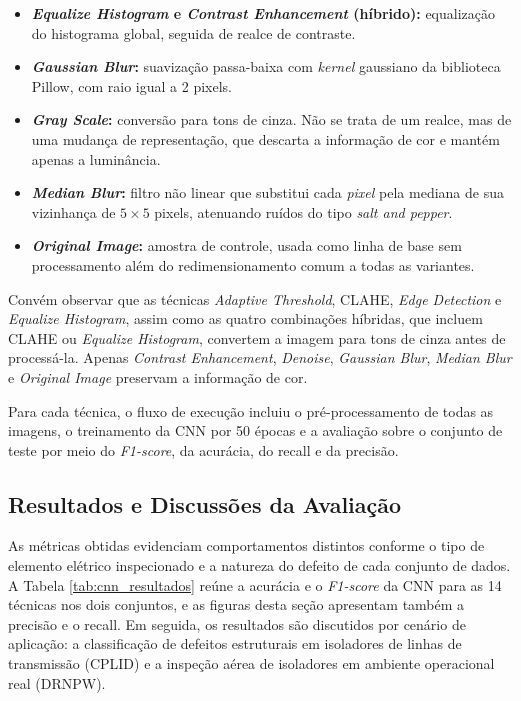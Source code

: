 \begin{itemize}
    \item \textbf{\textit{Equalize Histogram} e \textit{Contrast Enhancement} (híbrido):} equalização do histograma global, seguida de realce de contraste.
    \item \textbf{\textit{Gaussian Blur}:} suavização passa-baixa com \textit{kernel} gaussiano da biblioteca Pillow, com raio igual a 2 pixels.
    \item \textbf{\textit{Gray Scale}:} conversão para tons de cinza. Não se trata de um realce, mas de uma mudança de representação, que descarta a informação de cor e mantém apenas a luminância.
    \item \textbf{\textit{Median Blur}:} filtro não linear que substitui cada \textit{pixel} pela mediana de sua vizinhança de $5 \times 5$ pixels, atenuando ruídos do tipo \textit{salt and pepper}.
    \item \textbf{\textit{Original Image}:} amostra de controle, usada como linha de base sem processamento além do redimensionamento comum a todas as variantes.
\end{itemize}

Convém observar que as técnicas \textit{Adaptive Threshold}, CLAHE, \textit{Edge Detection} e \textit{Equalize Histogram}, assim como as quatro combinações híbridas, que incluem CLAHE ou \textit{Equalize Histogram}, convertem a imagem para tons de cinza antes de processá-la. Apenas \textit{Contrast Enhancement}, \textit{Denoise}, \textit{Gaussian Blur}, \textit{Median Blur} e \textit{Original Image} preservam a informação de cor.

Para cada técnica, o fluxo de execução incluiu o pré-processamento de todas as imagens, o treinamento da CNN por 50 épocas e a avaliação sobre o conjunto de teste por meio do \textit{F1-score}, da acurácia, do recall e da precisão.

\subsection{Resultados e Discussões da Avaliação}
As métricas obtidas evidenciam comportamentos distintos conforme o tipo de elemento elétrico inspecionado e a natureza do defeito de cada conjunto de dados. A Tabela \ref{tab:cnn_resultados} reúne a acurácia e o \textit{F1-score} da CNN para as 14 técnicas nos dois conjuntos, e as figuras desta seção apresentam também a precisão e o recall. Em seguida, os resultados são discutidos por cenário de aplicação: a classificação de defeitos estruturais em isoladores de linhas de transmissão (CPLID) e a inspeção aérea de isoladores em ambiente operacional real (DRNPW).

